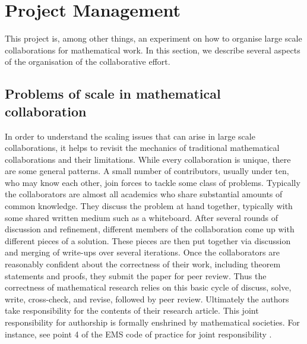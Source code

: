 \section{Project Management}\label{project-sec}

This project is, among other things, an experiment on how to organise large scale collaborations for mathematical work. In this section, we describe several aspects of the organisation of the collaborative effort.

\subsection{Problems of scale in mathematical collaboration}
In order to understand the scaling issues that can arise in large scale collaborations, it helps to revisit the mechanics of traditional mathematical collaborations and their limitations. While every collaboration is unique, there are some general patterns. A small number of contributors, usually under ten, who may know each other, join forces to tackle some class of problems. Typically the collaborators are almost all academics who share substantial amounts of common knowledge. They discuss the problem at hand together, typically with some shared written medium such as a whiteboard. After several rounds of discussion and refinement, different members of the collaboration come up with different pieces of a solution. These pieces are then put together via discussion and merging of write-ups over several iterations. Once the collaborators are reasonably confident about the correctness of their work, including theorem statements and proofs, they submit the paper for peer review. Thus the correctness of mathematical research relies on this basic cycle of discuss, solve, write, cross-check, and revise, followed by peer review. Ultimately the authors take responsibility for the contents of their research article. This joint responsibility for authorship is formally enshrined by mathematical societies. For instance, see point 4 of the EMS code of practice for joint responsibility \cite{EMS_code_of_practice}.

